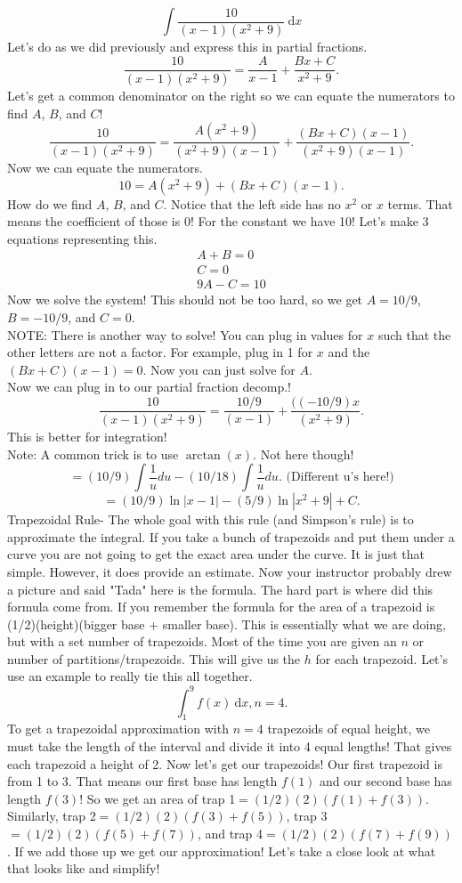 \documentclass[10pt]{article}
\newcommand{\dx}{\:\mathrm{d}x}
\theoremstyle{Theorem}
\theoremstyle{definition}
\theoremstyle{remark}
\theoremstyle{custom}
\begin{document}
$$\int \dfrac{10}{(x-1)(x^2+9)}\dx$$
Let's do as we did previously and express this in partial fractions.
 $$\dfrac{10}{(x-1)(x^2+9)}=\dfrac{A}{x-1}+\dfrac{Bx+C}{x^2+9}.$$
 Let's get a common denominator on the right so we can equate the numerators to find $A$, $B$, and $C$!
 $$\dfrac{10}{(x-1)(x^2+9)}=\dfrac{A(x^2+9)}{(x^2+9)(x-1)}+\dfrac{(Bx+C)(x-1)}{(x^2+9)(x-1)}.$$
 Now we can equate the numerators. 
 $$10=A(x^2+9)+(Bx+C)(x-1).$$
 How do we find $A$, $B$, and $C$. Notice that the left side has no $x^2$ or $x$ terms. That means the coefficient of those is 0! For the constant we have 10! Let's make 3 equations representing this.
 \begin{eqnarray*}
 A+B=0\\
 C=0\\
 9A-C=10
 \end{eqnarray*}
 Now we solve the system! This should not be too hard, so we get $A=10/9$, $B=-10/9$, and $C=0$.\\
NOTE: There is another way to solve! You can plug in values for $x$ such that the other letters are not a factor. For example, plug in 1 for $x$ and the $(Bx+C)(x-1)=0$. Now you can just solve for $A$.\\
Now we can plug in to our partial fraction decomp.!
 $$\dfrac{10}{(x-1)(x^2+9)}=\dfrac{10/9}{(x-1)}+\dfrac{((-10/9)x}{(x^2+9)}.$$
This is better for integration!\\
Note: A common trick is to use $\arctan(x)$. Not here though!
$$=(10/9)\int \dfrac{1}{u}du-(10/18)\int \dfrac{1}{u}du.\text{ (Different u's here!)}$$
$$=(10/9)\ln|x-1|-(5/9)\ln|x^2+9|+C.$$
\newpage
Trapezoidal Rule- The whole goal with this rule (and Simpson's rule) is to approximate the integral. If you take a bunch of trapezoids and put them under a curve you are not going to get the exact area under the curve. It is just that simple. However, it does provide an estimate. Now your instructor probably drew a picture and said "Tada" here is the formula. The hard part is where did this formula come from. If you remember the formula for the area of a trapezoid is (1/2)(height)(bigger base + smaller base). This is essentially what we are doing, but with a set number of trapezoids. Most of the time you are given an $n$ or number of partitions/trapezoids. This will give us the $h$ for each trapezoid. Let's use an example to really tie this all together.
$$\int_1^9 f(x) \dx, n=4.$$
To get a trapezoidal approximation with $n=4$ trapezoids of equal height, we must take the length of the interval and divide it into 4 equal lengths! That gives each trapezoid a height of 2.  Now let's get our trapezoids! Our first trapezoid is from 1 to 3. That means our first base has length $f(1)$ and our second base has length $f(3)$! So we get an area of trap 1$=(1/2)(2)(f(1)+f(3))$. Similarly, trap 2$=(1/2)(2)(f(3)+f(5))$, trap 3$=(1/2)(2)(f(5)+f(7))$, and trap 4$=(1/2)(2)(f(7)+f(9))$. If we add those up we get our approximation! Let's take a close look at what that looks like and simplify!
\end{document}
